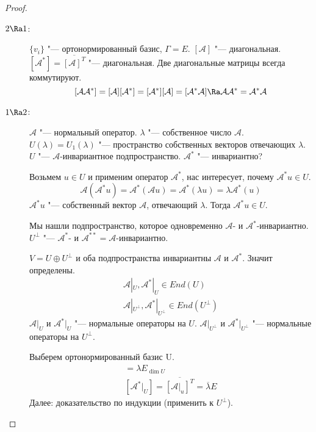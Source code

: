 \begin{proof}
	\begin{description}
	\item[$2 \Ra 1$:]
		$\{v_i\}$ "--- ортонормированный базис, $\Gamma = E$.
		$[\mathcal A] $ "--- диагональная.
		$[\mathcal{A}^*] = \overline{[\mathcal A]^T}$ "--- диагональная.
		Две диагональные матрицы всегда коммутируют.
		\[
			[\mathcal A\mathcal{A}^*]
			= [\mathcal A][\mathcal{A}^*]
			= [\mathcal{A}^*][\mathcal A]
			= [\mathcal{A}^*\mathcal A]
			\Ra \mathcal A\mathcal{A}^*
			= \mathcal{A}^*\mathcal A
		\]

	\item[$1 \Ra 2$:]
		$\mathcal A$ "--- нормальный оператор.
		$\lambda$ "--- собственное число $\mathcal A$.
		$U(\lambda) = U_1(\lambda)$ "--- пространство собственных векторов отвечающих $\lambda$.
		$U$ "--- $\mathcal A$-инвариантное подпространство.
		$\mathcal{A}^*$ "--- инвариантно?

		Возьмем $u \in U$ и применим оператор $\mathcal{A}^*$, нас интересует, почему $\mathcal{A}^*u \in U$.
		\[ \mathcal A(\mathcal{A}^*u) = \mathcal{A}^*(\mathcal Au) = \mathcal{A}^*(\lambda u) = \lambda \mathcal{A}^*(u) \]
		$\mathcal{A}^*u$ "--- собственный вектор $\mathcal A$, отвечающий $\lambda$.
		Тогда $\mathcal{A}^*u \in U$.

		Мы нашли подпространство, которое одновременно $\mathcal A$- и $\mathcal{A}^*$-инвариантно.
		$U^{\bot}$ "--- $\mathcal{A}^*$- и $\mathcal{A}^{**} = \mathcal A$-инвариантно.

		$V = U \oplus U^{\bot}$ и оба подпространства инвариантны $\mathcal A$ и $\mathcal{A}^*$.
		Значит определены.
		\begin{gather*}
			\mathcal A|_U, \mathcal{A}^*|_U \in End(U) \\
			\mathcal A|_{U^{\bot}}, \mathcal{A}^*|_{U^{\bot}} \in End(U^{\bot})
		\end{gather*}
		$\mathcal A|_U$ и $\mathcal{A}^*|_U$ "--- нормальные операторы на $U$.
		$\mathcal A|_{U^{\bot}}$ и $\mathcal{A}^*|_{U^{\bot}}$ "--- нормальные операторы на $U^{\bot}$.

		Выберем ортонормированный базис U.
		\begin{gather*}
			[\mathcal A|_U] = \lambda E_{\dim U} \\
			[\mathcal{A}^*|_U] = \overline{[\mathcal A|_u]^T} = \overline{\lambda}E
		\end{gather*}
		Далее: доказательство по индукции (применить к $U^{\bot}$).
	\end{description}
\end{proof}

